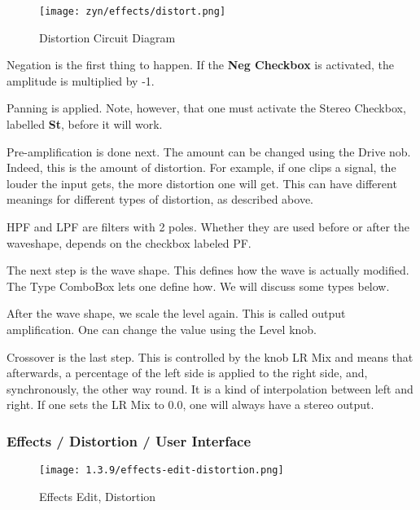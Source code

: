 \begin{figure}[H]
   \centering
   \texttt{[image: zyn/effects/distort.png]}
   \caption{Distortion Circuit Diagram}
   \label{fig:distortion_circuit_diagram}
\end{figure}

   Negation is the first thing to happen. If the \textbf{Neg Checkbox} is
   activated, the amplitude is multiplied by -1.

   Panning is applied. Note, however, that one must activate the Stereo
   Checkbox, labelled \textbf{St}, before it will work.

   Pre-amplification is done next. The amount can be changed using the Drive
   nob. Indeed, this is the amount of distortion. For example, if one clips a
   signal, the louder the input gets, the more distortion one will get. This
   can have different meanings for different types of distortion, as
   described above.

   HPF and LPF are filters with 2 poles. Whether they are used before or
   after the waveshape, depends on the checkbox labeled PF.

   The next step is the wave shape. This defines how the wave is actually
   modified. The Type ComboBox lets one define how. We will discuss some
   types below.

   After the wave shape, we scale the level again. This is called output
   amplification. One can change the value using the Level knob.

   Crossover is the last step. This is controlled by the knob LR Mix and
   means that afterwards, a percentage of the left side is applied to the
   right side, and, synchronously, the other way round. It is a kind of
   interpolation between left and right. If one sets the LR Mix to 0.0, one
   will always have a stereo output.

\subsubsection{Effects / Distortion / User Interface}
\label{subsubsec:effects_edit_distortion_ui}

\begin{figure}[H]
   \centering
   \texttt{[image: 1.3.9/effects-edit-distortion.png]}
   \caption{Effects Edit, Distortion}
   \label{fig:effects_edit_distortion}
\end{figure}

